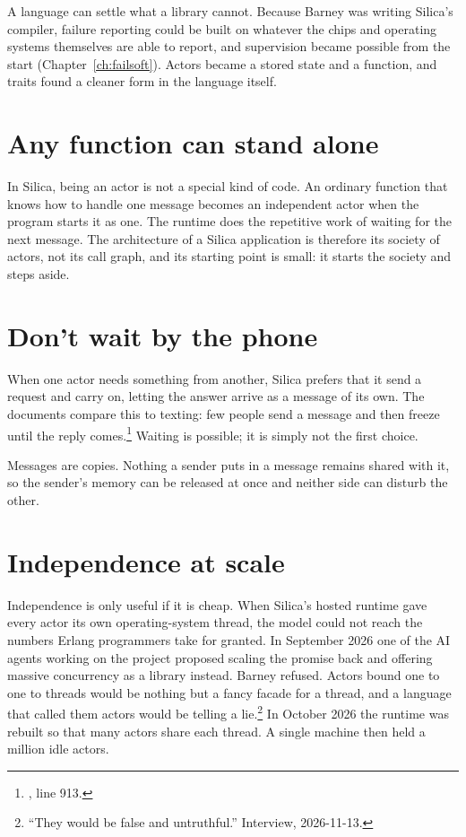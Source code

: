 A language can settle what a library cannot. Because Barney was writing
Silica's compiler, failure reporting could be built on whatever the chips and
operating systems themselves are able to report, and supervision became
possible from the start (Chapter~\ref{ch:failsoft}). Actors became a stored
state and a function, and traits found a cleaner form in the language itself.

\section{Any function can stand alone}

In Silica, being an actor is not a special kind of code. An ordinary function
that knows how to handle one message becomes an independent actor when the
program starts it as one. The runtime does the repetitive work of waiting for
the next message. The architecture of a Silica application is therefore its
society of actors, not its call graph, and its starting point is small: it
starts the society and steps aside.

\section{Don't wait by the phone}

When one actor needs something from another, Silica prefers that it send a
request and carry on, letting the answer arrive as a message of its own. The
documents compare this to texting: few people send a message and then freeze
until the reply comes.\footnote{, line 913.}
Waiting is possible; it is simply not the first choice.

Messages are copies. Nothing a sender puts in a message remains shared with it,
so the sender's memory can be released at once and neither side can disturb the
other.

\section{Independence at scale}

Independence is only useful if it is cheap. When Silica's hosted runtime gave
every actor its own operating-system thread, the model could not reach the
numbers Erlang programmers take for granted. In September 2026 one of the AI
agents working on the project proposed scaling the promise back and offering
massive concurrency as a library instead. Barney refused. Actors bound one to
one to threads would be nothing but a fancy facade for a thread, and a language
that called them actors would be telling a lie.\footnote{``They would be false
and untruthful.'' Interview, 2026-11-13.} In October 2026 the runtime was
rebuilt so that many actors share each thread. A single machine then held a
million idle actors.

